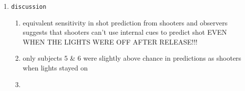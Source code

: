 \documentclass[12pt,twoside]{dukestatscithesis}
\providecommand{\tightlist}{%
  \setlength{\itemsep}{0pt}\setlength{\parskip}{0pt}}
\theoremstyle{definition}
\theoremstyle{definition}
\theoremstyle{definition}
\theoremstyle{remark}
\begin{document}
\begin{enumerate}
\begin{verbatim}
results
\end{verbatim}
  \begin{enumerate}
  \def\labelenumii{\alph{enumii}.}
  \item
    signal detection analysis
  \item
\begin{verbatim}
the measure of sensitivity (A_g) was area under ROC curve
\end{verbatim}
  \end{enumerate}
  \begin{enumerate}
  \def\labelenumii{\roman{enumii}.}
  \setcounter{enumii}{1}
  \tightlist
  \item
    average sensitivities were 0.5ish (approx chance) for pre-release
    pred.
  \item
    but good for at release or post release
  \item
    shooters were not more sensitive than observers
  \end{enumerate}
  \begin{enumerate}
  \def\labelenumii{\alph{enumii}.}
  \setcounter{enumii}{1}
  \item
    seq dep analysis
  \item
\begin{verbatim}
4 subjects had a significant p-value for alt hyp: p(H|H) > p(H|M)
\end{verbatim}
  \end{enumerate}
  \begin{enumerate}
  \def\labelenumii{\roman{enumii}.}
  \setcounter{enumii}{1}
  \tightlist
  \item
    in general, subjects as shoots \& obs were optimistic in that
    p(Hpred\textbar{}H) \textgreater{} p(Hpred\textbar{}M)
  \end{enumerate}
\item
\begin{verbatim}
discussion
\end{verbatim}
  \begin{enumerate}
  \def\labelenumii{\alph{enumii}.}
  \tightlist
  \item
    equivalent sensitivity in shot prediction from shooters and
    observers suggests that shooters can't use internal cues to predict
    shot EVEN WHEN THE LIGHTS WERE OFF AFTER RELEASE!!!
  \item
    only subjects 5 \& 6 were slightly above chance in predictions as
    shooters when lights stayed on
  \item

\end{enumerate}
\end{enumerate}
\end{document}
